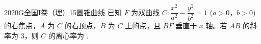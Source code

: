 
\begin{problem}{2020}{G}{全国I卷（理）}{15}{圆锥曲线}
已知 $ F $ 为双曲线 $ C: \dfrac{x^2}{a^2} - \dfrac{y^2}{b^2} = 1 $ ($ a > 0 $，$ b > 0 $) 的右焦点，$ A $ 为 $ C $ 的右顶点，$ B $ 为 $ C $ 上的点，且 $ BF $ 垂直于 $ x $ 轴。若 $ AB $ 的斜率为 $ 3 $，则 $ C $ 的离心率为 \underline{\hspace{4em}}.
\end{problem}

\begin{answer}

\end{answer}

\begin{solutions}

\end{solutions}